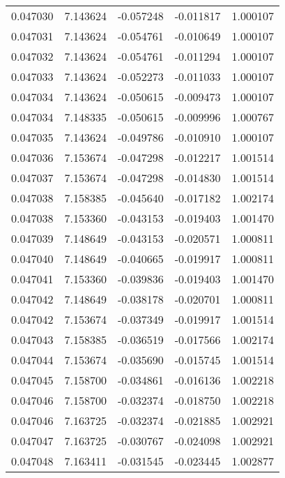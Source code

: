 \begin{tabular}{lrrrr}
0.047030    &  7.143624 & -0.057248 & -0.011817 &             1.000107 \\
0.047031    &  7.143624 & -0.054761 & -0.010649 &             1.000107 \\
0.047032    &  7.143624 & -0.054761 & -0.011294 &             1.000107 \\
0.047033    &  7.143624 & -0.052273 & -0.011033 &             1.000107 \\
0.047034    &  7.143624 & -0.050615 & -0.009473 &             1.000107 \\
0.047034    &  7.148335 & -0.050615 & -0.009996 &             1.000767 \\
0.047035    &  7.143624 & -0.049786 & -0.010910 &             1.000107 \\
0.047036    &  7.153674 & -0.047298 & -0.012217 &             1.001514 \\
0.047037    &  7.153674 & -0.047298 & -0.014830 &             1.001514 \\
0.047038    &  7.158385 & -0.045640 & -0.017182 &             1.002174 \\
0.047038    &  7.153360 & -0.043153 & -0.019403 &             1.001470 \\
0.047039    &  7.148649 & -0.043153 & -0.020571 &             1.000811 \\
0.047040    &  7.148649 & -0.040665 & -0.019917 &             1.000811 \\
0.047041    &  7.153360 & -0.039836 & -0.019403 &             1.001470 \\
0.047042    &  7.148649 & -0.038178 & -0.020701 &             1.000811 \\
0.047042    &  7.153674 & -0.037349 & -0.019917 &             1.001514 \\
0.047043    &  7.158385 & -0.036519 & -0.017566 &             1.002174 \\
0.047044    &  7.153674 & -0.035690 & -0.015745 &             1.001514 \\
0.047045    &  7.158700 & -0.034861 & -0.016136 &             1.002218 \\
0.047046    &  7.158700 & -0.032374 & -0.018750 &             1.002218 \\
0.047046    &  7.163725 & -0.032374 & -0.021885 &             1.002921 \\
0.047047    &  7.163725 & -0.030767 & -0.024098 &             1.002921 \\
0.047048    &  7.163411 & -0.031545 & -0.023445 &             1.002877 \\

\end{tabular}
